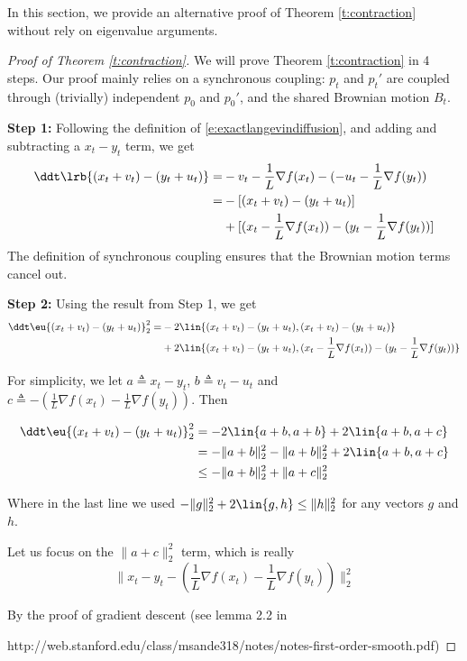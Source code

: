 In this section, we provide an alternative proof of Theorem \ref{t:contraction} without rely on eigenvalue arguments. 
\begin{proof}[Proof of Theorem \ref{t:contraction}]
We will prove Theorem \ref{t:contraction} in 4 steps. Our proof mainly relies on a synchronous coupling: $p_t$ and $p_t'$ are coupled through (trivially) independent $p_0$ and $p_0'$, and the shared Brownian motion $B_t$.

\textbf{Step 1:}
Following the definition of \eqref{e:exactlangevindiffusion}, and adding and subtracting a $x_t-y_t$ term, we get
\begin{align*}
\ddt \lrb{(x_t+v_t) - (y_t+u_t)}
=& -v_t - \frac{1}{L} \nabla f(x_t) - (-u_t - \frac{1}{L} \nabla f(y_t))\\
=& -[(x_t+v_t) -(y_t+u_t)] \\
&+ [(x_t-\frac{1}{L} \nabla f(x_t)) - (y_t - \frac{1}{L} \nabla f(y_t))]
\end{align*}
The definition of synchronous coupling ensures that the Brownian motion terms cancel out.

\textbf{Step 2:}
Using the result from Step 1, we get
\begin{align*}
\ddt \eu{(x_t+v_t) - (y_t+u_t)}_2^2
=& - 2 \lin {(x_t+v_t) - (y_t+u_t), (x_t+v_t) -(y_t+u_t)}\\
  & + 2 \lin {(x_t+v_t) -(y_t+u_t), (x_t-\frac{1}{L} \nabla f(x_t)) - (y_t - \frac{1}{L} \nabla f(y_t))}
\end{align*}

For simplicity, we let $a\triangleq x_t - y_t$, $b\triangleq v_t - u_t$ and $c \triangleq -(\frac{1}{L} \nabla f(x_t) - \frac{1}{L} \nabla f(y_t))$. Then

\begin{align*}
\ddt \eu{(x_t+v_t) - (y_t+u_t)}_2^2
& = -2 \lin{a+b, a+b} + 2\lin{a+b, a+c}\\
& =  - \|a+b\|_2^2  - \|a+b\|_2^2 + 2\lin{a+b,a+c}\\
& \le -\|a+b\|_2^2  + \|a+c\|_2^2
\end{align*}

Where in the last line we used $-\|g\|_2^2 + 2\lin{g,h}\leq \|h\|_2^2$ for any vectors $g$ and $h$.

Let us focus on the $\|a+c\|_2^2$ term, which is really
$$\|x_t-y_t - (\frac{1}{L} \nabla f(x_t) - \frac{1}{L} \nabla f(y_t))\|_2^2$$

By the proof of gradient descent (see lemma 2.2 in 

http://web.stanford.edu/class/msande318/notes/notes-first-order-smooth.pdf) 


\end{proof}
